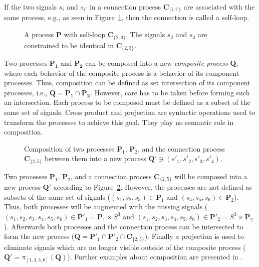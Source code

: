 If the two signals $s_i$ and $s_{i'}$ in a connection process $\mathbf{C}_{\{i,i'\}}$ are
associated with the same process, e.g., as seen in Figure~\ref{fig:example-self-loop},
then the connection is called a self-loop.

\begin{figure}[htb]
\centering

\caption{A process $\mathbf{P}$ with self-loop $\mathbf{C}_{\{2,3\}}$.
         The signals $s_2$ and $s_3$ are constrained to be identical in
         $\mathbf{C}_{\{2,3\}}$.\label{fig:example-self-loop}}
\end{figure}

Two processes $\mathbf{P_1}$ and $\mathbf{P_2}$ can be composed into
a new \emph{composite process} $\mathbf{Q}$, where
each behavior of the composite process is a behavior of its
component processes. Thus, composition can be defined as set intersection of
its component processes, i.e., $\mathbf{Q} = \mathbf{P_1} \cap \mathbf{P_2}$.
However, care has to be taken before forming such an intersection.
Each process to be composed must be defined as a subset of the same
set of signals.
Cross product and projection are syntactic operations
used to transform the processes to achieve this goal. They play no
semantic role in composition.

\begin{figure}[htb]
\centering

\caption{Composition of two processes $\mathbf{P}_1$, $\mathbf{P}_2$,
         and the connection process $\mathbf{C}_{\{2,5\}}$ between them
         into a new process $\mathbf{Q}' \ni (s'_1,s'_2,s'_3,s'_4)$.
         \label{fig:example-tsm-composition}}
\end{figure}

\begin{example}
Two processes $\mathbf{P}_1$, $\mathbf{P}_2$, and a connection process
$\mathbf{C}_{\{2,5\}}$ will be composed into a new process $\mathbf{Q}'$ according to
Figure~\ref{fig:example-tsm-composition}. However, the processes are
not defined as subsets of the same set of signals
($(s_1,s_2,s_3) \in \mathbf{P}_1$ and $(s_4,s_5,s_6) \in \mathbf{P}_2$).
Thus, both processes will be augmented with the missing signals
($(s_1,s_2,s_3,s_4,s_5,s_6) \in \mathbf{P}'_1 = \mathbf{P}_1 \times S^3$ and
 $(s_1,s_2,s_3,s_4,s_5,s_6) \in \mathbf{P}'_2 = S^3 \times \mathbf{P}_2$).
Afterwards both processes and the connection process can be intersected to form
the new process ($\mathbf{Q} = \mathbf{P}'_1 \cap \mathbf{P}'_2 \cap \mathbf{C}_{\{2,5\}}$).
Finally a projection is used to eliminate signals which are no longer
visible outside of the composite process ($\mathbf{Q}' = \pi{}_{[1,4,3,6]}(\mathbf{Q})$).
Further examples about composition are presented in \cite{ls:1998}.
\end{example}

